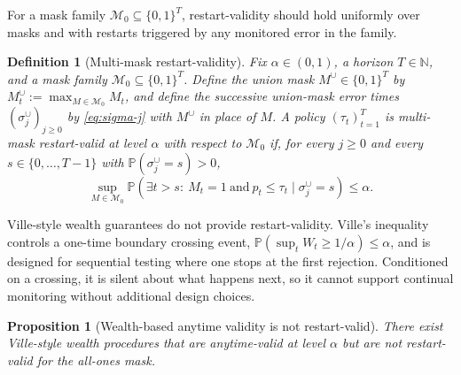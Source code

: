 \documentclass{uai2026} %
\newtheorem{proposition}[theorem]{Proposition}
\newtheorem{definition}[theorem]{Definition}
\newcommand{\N}{\mathbb{N}}
\newcommand{\1}{\mathbf{1}}
\newcommand{\prob}{\mathbb{P}}
\newcommand{\mcal}{\mathcal{M}}
\begin{document}
For a mask family $\mcal_0\subseteq\{0,1\}^T$, restart-validity should hold uniformly over masks and with restarts triggered by any monitored error in the family.

\begin{definition}[Multi-mask restart-validity]
  \label{def:multi-restart}
  Fix $\alpha\in(0,1)$, a horizon $T\in\N$, and a mask family $\mcal_0\subseteq\{0,1\}^T$.
  Define the union mask $M^{\cup}\in\{0,1\}^T$ by $M^{\cup}_t:=\max_{M\in\mcal_0} M_t$, and define the successive union-mask error times $(\sigma^{\cup}_j)_{j\ge 0}$ by \eqref{eq:sigma-j} with $M^{\cup}$ in place of $M$.
  A policy $(\tau_t)_{t=1}^T$ is multi-mask restart-valid at level $\alpha$ with respect to $\mcal_0$ if, for every $j\ge 0$ and every $s\in\{0,\dots,T-1\}$ with $\prob(\sigma^{\cup}_j=s)>0$,
  \begin{equation*}
    \sup_{M\in\mcal_0}\prob\left(\exists t>s:\ M_t=1\ \text{and}\ p_t\le \tau_t\mid \sigma^{\cup}_j=s\right)\le \alpha.
  \end{equation*}
\end{definition}

Ville-style wealth guarantees do not provide restart-validity.
Ville's inequality controls a one-time boundary crossing event, $\prob(\sup_t W_t\ge 1/\alpha)\le \alpha$, and is designed for sequential testing where one stops at the first rejection.
Conditioned on a crossing, it is silent about what happens next, so it cannot support continual monitoring without additional design choices.

\begin{proposition}[Wealth-based anytime validity is not restart-valid]
  \label{prop:wealth-not-restart}
  There exist Ville-style wealth procedures that are anytime-valid at level $\alpha$ but are not restart-valid for the all-ones mask.
\end{proposition}
\end{document}
